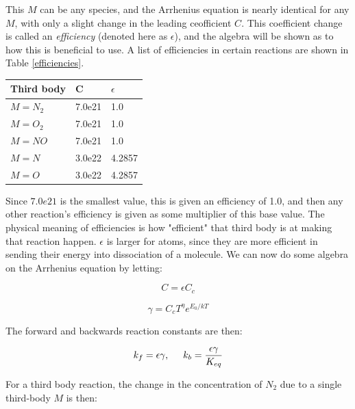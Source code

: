 \documentclass[10pt]{article}
\begin{document}
\begin{flushleft}
This $M$ can be any species, and the Arrhenius equation is nearly identical for any $M$, with only a slight change in the leading ceofficient $C$. This coefficient change is called an \textit{efficiency} (denoted here as $\epsilon$), and the algebra will be shown as to how this is beneficial to use. A list of efficiencies in certain reactions are shown in Table \ref{efficiencies}.

\begin{center}
\label{efficiencies}
\begin{tabular}{p{25mm} p{15mm} p{15mm}}
\hline
Third body & C & $\epsilon$ \\
\hline
$M = N_2$ & 7.0e21 & 1.0 \\
$M = O_2$ & 7.0e21 & 1.0 \\
$M = NO$  & 7.0e21 & 1.0 \\
$M = N$   & 3.0e22 & 4.2857 \\
$M = O$   & 3.0e22 & 4.2857 \\
\hline
\end{tabular}
\end{center}

Since $7.0e21$ is the smallest value, this is given an efficiency of 1.0, and then any other reaction's efficiency is given as some multiplier of this base value. The physical meaning of efficiencies is how "efficient" that third body is at making that reaction happen. $\epsilon$ is larger for atoms, since they are more efficient in sending their energy into dissociation of a molecule. We can now do some algebra on the Arrhenius equation by letting:

\begin{equation}
    C = \epsilon C_c
\end{equation}

\begin{equation}
    \gamma = C_c T^\eta e^{E_0/kT}
\end{equation}

The forward and backwards reaction constants are then:

\begin{equation}
    k_f = \epsilon \gamma, \hspace{5mm} k_b = \frac{\epsilon \gamma}{K_{eq}}
\end{equation}

For a third body reaction, the change in the concentration of $N_2$ due to a single third-body $M$ is then:


\end{flushleft}
\end{document}
